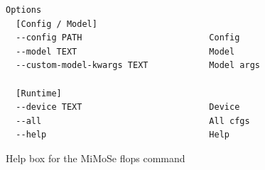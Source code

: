 \documentclass{article}
\begin{document}
\begin{figure}[h]
\centering
\begin{tcolorbox}[
  colback=lightgreenbg,
  colframe=lightgreenframe,
  arc=2mm,
  boxrule=0.6pt,
  title=MiMoSe flops,
  fonttitle=\bfseries
]
\begin{Verbatim}[breaklines=true,breakanywhere=true,fontsize=\small]
Options
  [Config / Model]
  --config PATH                         Config
  --model TEXT                          Model
  --custom-model-kwargs TEXT            Model args

  [Runtime]
  --device TEXT                         Device
  --all                                 All cfgs
  --help                                Help
\end{Verbatim}
\end{tcolorbox}
\caption{Help box for the MiMoSe flops command}
\label{fig:mimose_flops}
\end{figure}
\end{document}

